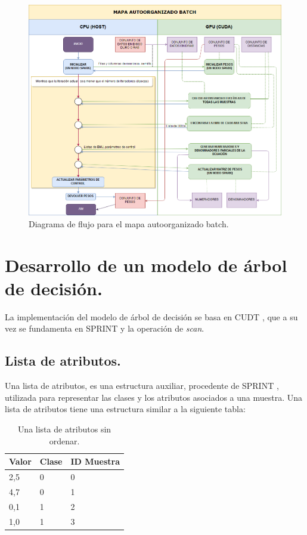 \begin{figure}[ht]
\centering
\includegraphics[scale=0.35]{imagenes/flujosombatch.png}
\caption{Diagrama de flujo para el mapa autoorganizado batch.}
\label{img:sombatch}
\end{figure}

\newpage
\section{Desarrollo de un modelo de árbol de decisión.}
La implementación del modelo de árbol de decisión se basa en CUDT \cite{cudt}, que a su vez se fundamenta en SPRINT \cite{sprint} y la operación de \textit{scan}.

\subsection{Lista de atributos.}
Una lista de atributos, es una estructura auxiliar, procedente de SPRINT \cite{sprint}, utilizada para representar las clases y los atributos asociados a una muestra. Una lista de atributos tiene una estructura similar a la siguiente tabla:

\begin{table}[ht]
\centering
\begin{tabular}{@{}lll@{}}
\toprule
Valor & Clase & ID Muestra \\ \midrule
2,5   & 0     & 0          \\
4,7   & 0     & 1          \\
0,1   & 1     & 2          \\
1,0   & 1     & 3          \\ \bottomrule
\end{tabular}
\caption{Una lista de atributos sin ordenar.}
\label{tab:ejlistaatributos}
\end{table}

